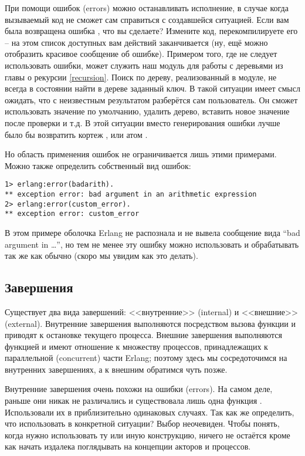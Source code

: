 При помощи ошибок (errors) можно останавливать исполнение, в случае когда вызываемый код не сможет сам справиться с создавшейся ситуацией.
Если вам была возвращена ошибка , что вы сделаете?
Измените код, перекомпилируете его \--- на этом список доступных вам действий заканчивается (ну, ещё можно отобразить красивое сообщение об ошибке).
Примером того, где не следует использовать ошибки, может служить наш модуль для работы с деревьями из главы о рекурсии \ref{recursion}.
Поиск по дереву, реализованный в модуле, не всегда в состоянии найти в дереве заданный ключ.
В такой ситуации имеет смысл ожидать, что с неизвестным результатом разберётся сам пользователь. 
Он сможет использовать значение по умолчанию, удалить дерево, вставить новое значение после проверки и т.д.
В этой ситуации вместо генерирования ошибки лучше было бы возвратить кортеж , или атом .

Но область применения ошибок не ограничивается лишь этими примерами.
Можно также определить собственный вид ошибок:
\begin{lstlisting}[style=erlang]
1> erlang:error(badarith).
** exception error: bad argument in an arithmetic expression
2> erlang:error(custom_error).
** exception error: custom_error
\end{lstlisting}

В этом примере оболочка Erlang не распознала  и не вывела сообщение вида ``bad argument in \ldots'', но тем не менее эту ошибку можно использовать и обрабатывать так же как обычно (скоро мы увидим как это делать).

\subsection{Завершения}
\label{exits}
Существует два вида завершений: <<внутренние>> (internal) и <<внешние>> (external).
Внутренние завершения выполняются посредством вызова функции  и приводят к остановке текущего процесса.
Внешние завершения выполняются функцией  и имеют отношение к множеству процессов, принадлежащих к параллельной (concurrent) части Erlang; поэтому здесь мы сосредоточимся на внутренних завершениях, а к внешним обратимся чуть позже.

Внутренние завершения очень похожи на ошибки (errors).
На самом деле, раньше они никак не различались и существовала лишь одна функция .
Использовали их в приблизительно одинаковых случаях.
Так как же определить, что использовать в конкретной ситуации?
Выбор неочевиден.
Чтобы понять, когда нужно использовать ту или иную конструкцию, ничего не остаётся кроме как начать издалека поглядывать на концепции акторов и процессов.


